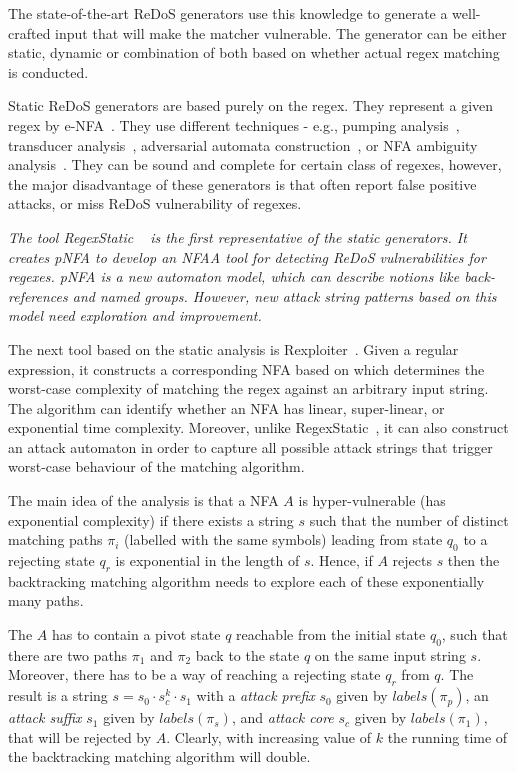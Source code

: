 \documentclass[acmsmall,screen]{acmart}
\begin{document}
The state-of-the-art ReDoS generators use this knowledge to generate a well-crafted input that will make the matcher vulnerable.
%
The generator can be either static, dynamic or combination of both based on whether actual regex matching is conducted.
%

Static ReDoS generators are based purely on the regex.
%
They represent a given regex by e-NFA~\cite{staticAna}.
%
They use different techniques - e.g., pumping analysis~\cite{staticAna, staticAna, rxxr2thesis}, 
%
transducer analysis~\cite{Satoshi14},
%
adversarial automata construction~\cite{rexploiter},
%
or NFA ambiguity analysis~\cite{weideman}.
%
They can be sound and complete for certain class of regexes,
however, the major disadvantage of these generators is that 
often report false positive attacks, or miss ReDoS vulnerability
of regexes.

%



\emph{
The tool RegexStatic ~\cite{weideman} is the first representative of the static generators.
%
It creates pNFA to develop an NFAA tool for detecting ReDoS vulnerabilities
for regexes. 
%
pNFA is a new automaton model, which can
describe notions like back-references and named groups. 
%
However,
new attack string patterns based on this model need exploration
and improvement.
%
}



The next tool based on the static analysis is  Rexploiter~\cite{rexploiter}. 
%
Given a regular expression, 
it constructs a corresponding NFA based on which determines the worst-case complexity of matching the regex
against an arbitrary input string.
%
The algorithm can identify whether an NFA has linear, super-linear, or exponential time complexity.
%
Moreover, unlike RegexStatic~\cite{weideman}, it can also construct an attack automaton in order to capture all possible attack strings 
that trigger worst-case behaviour of the matching algorithm.

The main idea of the analysis is that a NFA $A$ is hyper-vulnerable (has exponential complexity)
if there exists a string $s$ such that the number of distinct matching paths $\pi_i$ (labelled with the same symbols) leading from state $q_0$ to a rejecting
state $q_r$ is exponential in the length of $s$.
%
Hence, if $A$ rejects $s$ then the backtracking matching algorithm needs to explore each of these exponentially many paths.
%


The $A$ has to contain a pivot state $q$ reachable from the initial state $q_0$, such that there are two paths $\pi_1$ and $\pi_2$ back to the state $q$ 
on the same input string $s$.
%
Moreover, there has to be a way of reaching a rejecting state $q_r$ from $q$.
%
The result is a string $s = s_{0} \cdot s_{c}^{k} \cdot s_{1}$ with a \emph{attack prefix} $s_0$ given by $labels(\pi_p)$, an \emph{attack suffix} $s_1$ given by $labels(\pi_s)$,
and \emph{attack core} $s_c$ given by $labels(\pi_1)$, that will be rejected by $A$.
%
Clearly, with increasing value of $k$ the running time of the backtracking matching algorithm will double.
\end{document}
